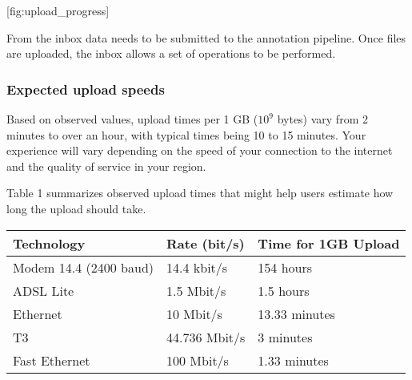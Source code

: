 \documentclass[letterpaper,10pt,english]{sphinxmanual}
\begin{document}
{[}fig:upload\_progress{]}

From the inbox data needs to be submitted to the annotation pipeline.
Once files are uploaded, the inbox allows a set of operations to be
performed.


\subsubsection{Expected upload speeds}
\label{\detokenize{faq:expected-upload-speeds}}
Based on observed values, upload times per 1 GB (\(10^9\) bytes)
vary from 2 minutes to over an hour, with typical times being 10 to 15
minutes. Your experience will vary depending on the speed of your
connection to the internet and the quality of service in your region.

Table 1 summarizes observed upload times that might help users estimate
how long the upload should take.


\begin{savenotes}\sphinxattablestart
\centering
{}
\sphinxthecaptionisattop
{}\label{\detokenize{faq:id6}}
\sphinxaftertopcaption
\begin{tabulary}{\linewidth}[t]{|T|T|T|}
\hline
\sphinxstyletheadfamily 
Technology
&\sphinxstyletheadfamily 
Rate (bit/s)
&\sphinxstyletheadfamily 
Time for 1GB Upload
\\
\hline
Modem 14.4 (2400 baud)
&
14.4 kbit/s
&
154 hours
\\
\hline
ADSL Lite
&
1.5 Mbit/s
&
1.5 hours
\\
\hline
Ethernet
&
10 Mbit/s
&
13.33 minutes
\\
\hline
T3
&
44.736 Mbit/s
&
3 minutes
\\
\hline
Fast Ethernet
&
100 Mbit/s
&
1.33 minutes
\\
\hline
\end{tabulary}
\par
\sphinxattableend\end{savenotes}
\end{document}
